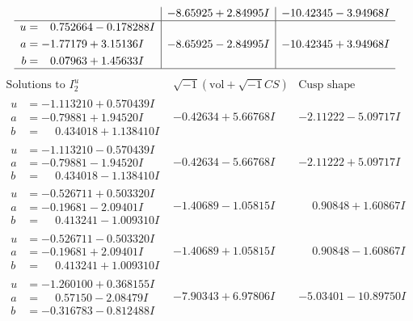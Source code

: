 \documentclass[1p]{elsarticle_modified}
\theoremstyle{definition}
\newcommand{\I}{\sqrt{-1}}
\begin{document}
$$\begin{array}{c|c|c}
 & -8.65925 + 2.84995 I & -10.42345 - 3.94968 I \\ \hline\begin{aligned}
u &= \phantom{-}0.752664 - 0.178288 I \\
a &= -1.77179 + 3.15136 I \\
b &= \phantom{-}0.07963 + 1.45633 I\end{aligned}
 & -8.65925 - 2.84995 I & -10.42345 + 3.94968 I\\
 \hline 
 \end{array}$$\newpage$$\begin{array}{c|c|c}  
\text{Solutions to }I^u_{2}& \I (\text{vol} + \sqrt{-1}CS) & \text{Cusp shape}\\
 \hline 
\begin{aligned}
u &= -1.113210 + 0.570439 I \\
a &= -0.79881 + 1.94520 I \\
b &= \phantom{-}0.434018 + 1.138410 I\end{aligned}
 & -0.42634 + 5.66768 I & -2.11222 - 5.09717 I \\ \hline\begin{aligned}
u &= -1.113210 - 0.570439 I \\
a &= -0.79881 - 1.94520 I \\
b &= \phantom{-}0.434018 - 1.138410 I\end{aligned}
 & -0.42634 - 5.66768 I & -2.11222 + 5.09717 I \\ \hline\begin{aligned}
u &= -0.526711 + 0.503320 I \\
a &= -0.19681 - 2.09401 I \\
b &= \phantom{-}0.413241 - 1.009310 I\end{aligned}
 & -1.40689 - 1.05815 I & \phantom{-}0.90848 + 1.60867 I \\ \hline\begin{aligned}
u &= -0.526711 - 0.503320 I \\
a &= -0.19681 + 2.09401 I \\
b &= \phantom{-}0.413241 + 1.009310 I\end{aligned}
 & -1.40689 + 1.05815 I & \phantom{-}0.90848 - 1.60867 I \\ \hline\begin{aligned}
u &= -1.260100 + 0.368155 I \\
a &= \phantom{-}0.57150 - 2.08479 I \\
b &= -0.316783 - 0.812488 I\end{aligned}
 & -7.90343 + 6.97806 I & -5.03401 - 10.89750 I \\ \hline\begin{aligned}

\end{aligned}
\end{array}$$
\end{document}

